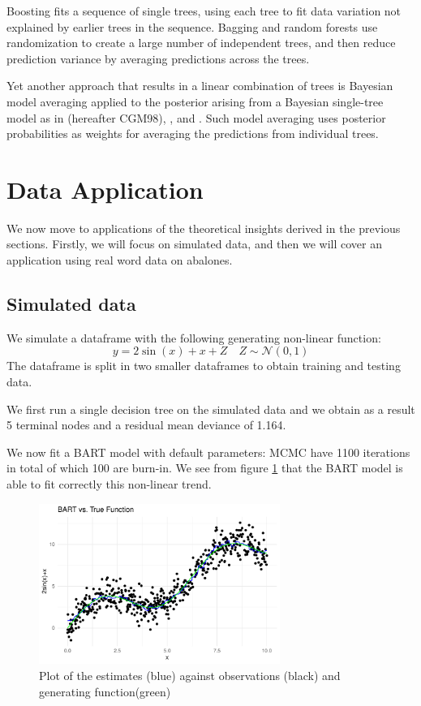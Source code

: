 \documentclass[a4paper,11pt]{article}
\begin{document}
Boosting fits a sequence of single trees, using each tree to fit data variation not explained by earlier trees in the sequence. Bagging and random forests use randomization to create a large number of independent trees, and then reduce prediction variance by averaging predictions across the trees.

Yet another approach that results in a linear combination of trees is Bayesian model averaging applied to the posterior arising from a Bayesian single-tree model as in \cite{chipman1998} (hereafter CGM98), \cite{denison1998}, \cite{blanchard2004} and \cite{wu2007}. Such model averaging uses posterior probabilities as weights for averaging the predictions from individual trees.
  
\section{Data Application}

We now move to applications of the theoretical insights derived in the previous sections. Firstly, we will focus on simulated data, and then we will cover an application using real word data on abalones.

\subsection{Simulated data}
We simulate a dataframe with the following generating non-linear function:
\begin{equation}
  y = 2\sin(x)+x+Z \quad Z \sim \mathcal{N}(0,1)
\end{equation}
The dataframe is split in two smaller dataframes to obtain training and testing data.

We first run a single decision tree on the simulated data and we obtain as a result 5 terminal nodes and a 
residual mean deviance of 1.164. 

We now fit a BART model with default parameters:  MCMC have 1100 iterations in total of which 100 are burn-in. We see from figure \ref{plot_sin1} that the BART model is able to fit correctly this non-linear trend.

\begin{figure}
  \centering
  \includegraphics[width=0.7\textwidth]{../outputs/sin_plot.pdf}
  \caption{Plot of the estimates (blue) against observations (black) and generating function(green)}
  \label{plot_sin1}
\end{figure}
\end{document}
